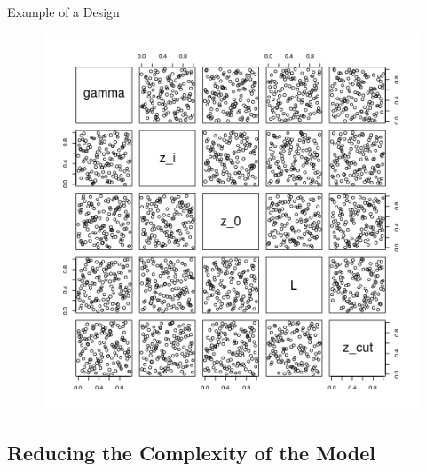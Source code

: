 \documentclass[11pt]{beamer}
\theoremstyle{plain}
\theoremstyle{definition}
\begin{document}
\begin{frame}{Example of a Design}
\begin{figure}
\includegraphics[scale=0.35]{./codes/experimental_design128.png}
\end{figure}

\end{frame}

\subsection{Reducing the Complexity of the Model}
\end{document}
